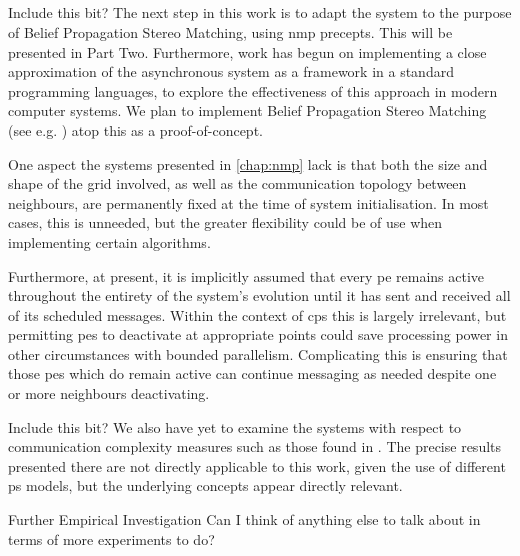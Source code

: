 
\subsection{}
\begin{anfxerror}{Include this bit?}
The next step in this work is to adapt the system to the purpose of Belief Propagation Stereo Matching, using \gls{nmp} precepts.  This will be presented in Part Two.  Furthermore, work has begun on implementing a close approximation of the asynchronous system as a framework in a standard programming languages, to explore the effectiveness of this approach in modern computer systems.  We plan to implement Belief Propagation Stereo Matching (see e.g. \cite{Blake2011,Felzenszwalb2011,JianSun2003}) atop this as a proof-of-concept.
\end{anfxerror}

One aspect the systems presented in \cref{chap:nmp} lack is that both the size and shape of the grid involved, as well as the communication topology between neighbours, are permanently fixed at the time of system initialisation.  In most cases, this is unneeded, but the greater flexibility could be of use when implementing certain algorithms.

Furthermore, at present, it is implicitly assumed that every \gls{pe} remains active throughout the entirety of the system's evolution until it has sent and received all of its scheduled messages.  Within the context of \gls{cps} this is largely irrelevant, but permitting \glspl{pe} to deactivate at appropriate points could save processing power in other circumstances with bounded parallelism.  Complicating this is ensuring that those \glspl{pe} which do remain active can continue messaging as needed despite one or more neighbours deactivating.

\begin{anfxerror}{Include this bit?}
We also have yet to examine the systems with respect to communication complexity measures such as those found in \cite{Juayong2020}.  The precise results presented there are not directly applicable to this work, given the use of different \gls{ps} models, but the underlying concepts appear directly relevant.
\end{anfxerror}



\begin{anfxerror}{Further Empirical Investigation}
Can I think of anything else to talk about in terms of more experiments to do?
\end{anfxerror}
